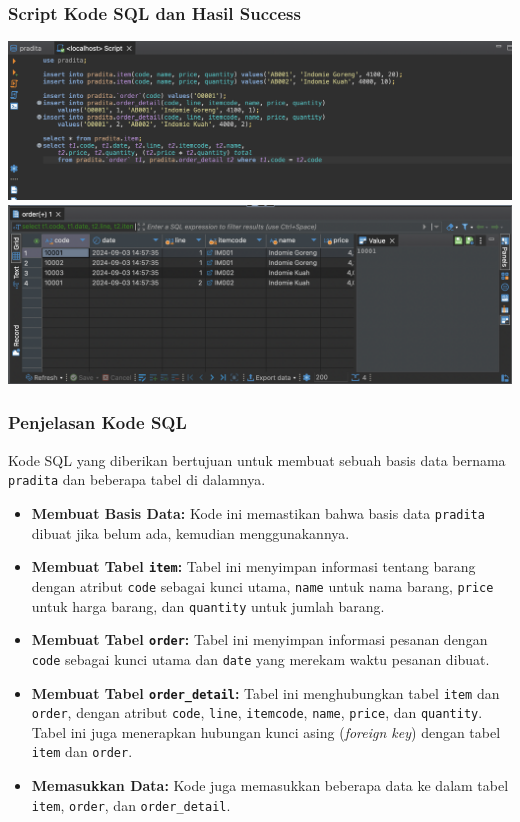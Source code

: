 \subsubsection{Script Kode SQL dan Hasil Success}
\includegraphics[width=1\textwidth]{assets/pertemuan12/dbeaver-database.png} 
\includegraphics[width=1\textwidth]{assets/pertemuan12/dbeaver-success-script.png}

\subsubsection{Penjelasan Kode SQL}

Kode SQL yang diberikan bertujuan untuk membuat sebuah basis data bernama \texttt{pradita} dan beberapa tabel di dalamnya. 

\begin{itemize}
	\item \textbf{Membuat Basis Data:} Kode ini memastikan bahwa basis data \texttt{pradita} dibuat jika belum ada, kemudian menggunakannya.
	\item \textbf{Membuat Tabel \texttt{item}:} Tabel ini menyimpan informasi tentang barang dengan atribut \texttt{code} sebagai kunci utama, \texttt{name} untuk nama barang, \texttt{price} untuk harga barang, dan \texttt{quantity} untuk jumlah barang.
	\item \textbf{Membuat Tabel \texttt{order}:} Tabel ini menyimpan informasi pesanan dengan \texttt{code} sebagai kunci utama dan \texttt{date} yang merekam waktu pesanan dibuat.
	\item \textbf{Membuat Tabel \texttt{order\_detail}:} Tabel ini menghubungkan tabel \texttt{item} dan \texttt{order}, dengan atribut \texttt{code}, \texttt{line}, \texttt{itemcode}, \texttt{name}, \texttt{price}, dan \texttt{quantity}. Tabel ini juga menerapkan hubungan kunci asing (\textit{foreign key}) dengan tabel \texttt{item} dan \texttt{order}.
	\item \textbf{Memasukkan Data:} Kode juga memasukkan beberapa data ke dalam tabel \texttt{item}, \texttt{order}, dan \texttt{order\_detail}.
\end{itemize}

